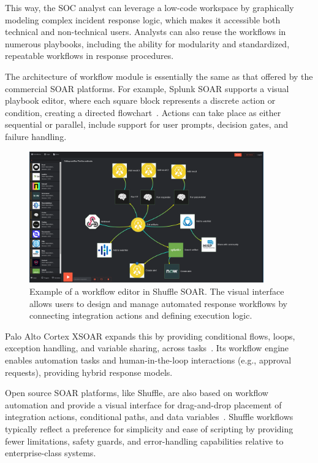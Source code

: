 This way, the SOC analyst can leverage a low-code workspace by graphically modeling complex incident response logic, which makes it accessible both technical and non-technical users. Analysts can also reuse the workflows in numerous playbooks, including the ability for modularity and standardized, repeatable workflows in response procedures.

The architecture of workflow module is essentially the same as that offered by the commercial SOAR platforms. For example, Splunk SOAR supports a visual playbook editor, where each square block represents a discrete action or condition, creating a directed flowchart~\cite{splunk}. Actions can take place as either sequential or parallel, include support for user prompts, decision gates, and failure handling.

\begin{figure}[ht]
    \centering
    \includegraphics[width=0.9\textwidth]{images/shuffle_soar_workflow.png}
        \caption[Example of a workflow editor in Shuffle SOAR]{Example of a workflow editor in Shuffle SOAR. The visual interface allows users to design and manage automated response workflows by connecting integration actions and defining execution logic.}
    \label{fig:shuffle-soar-workflow}
\end{figure}

Palo Alto Cortex XSOAR expands this by providing conditional flows, loops, exception handling, and variable sharing, across tasks~\cite{paloalto}. Its workflow engine enables automation tasks and human-in-the-loop interactions (e.g., approval requests), providing hybrid response models.

Open source SOAR platforms, like Shuffle, are also based on workflow automation and provide a visual interface for drag-and-drop placement of integration actions, conditional paths, and data variables~\cite{techtarget}. Shuffle workflows typically reflect a preference for simplicity and ease of scripting by providing fewer limitations, safety guards, and error-handling capabilities relative to enterprise-class systems.

